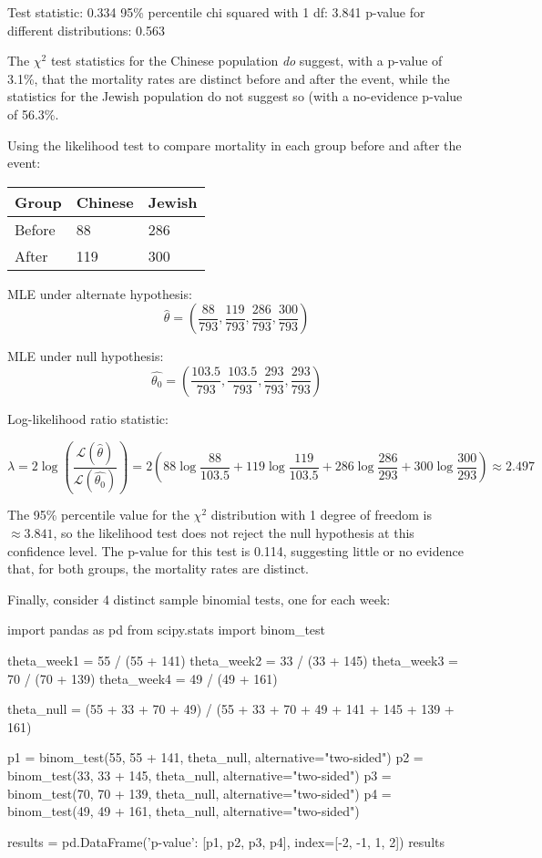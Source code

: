 \begin{console}
Test statistic:                         0.334
95\% percentile chi squared with 1 df:   3.841
p-value for different distributions:    0.563
\end{console}

The \(\chi^{2}\) test statistics for the Chinese population \emph{do}
suggest, with a p-value of 3.1\%, that the mortality rates are distinct
before and after the event, while the statistics for the Jewish
population do not suggest so (with a no-evidence p-value of 56.3\%.

Using the likelihood test to compare mortality in each group before and
after the event:

\begin{table}[H]
\centering
\begin{tabular}{@{}lll@{}}
\toprule
Group & Chinese & Jewish \\
\midrule
Before & 88 & 286 \\
After & 119 & 300 \\
\bottomrule
\end{tabular}
\end{table}

MLE under alternate hypothesis:
\[\hat{\theta} = \left( \frac{88}{793}, \frac{119}{793}, \frac{286}{793}, \frac{300}{793} \right)\]

MLE under null hypothesis:
\[\hat{\theta_{0}} =\left( \frac{103.5}{793}, \frac{103.5}{793}, \frac{293}{793}, \frac{293}{793} \right)\]

Log-likelihood ratio statistic:

\[ \lambda = 2 \log \left( \frac{\mathcal{L}(\hat{\theta})}{\mathcal{L}(\hat{\theta_{0}})} \right)
= 2 \left( 88 \log \frac{88}{103.5} + 119 \log \frac{119}{103.5} + 286 \log \frac{286}{293} + 300 \log \frac{300}{293} \right) \approx 2.497
\]

The 95\% percentile value for the \(\chi^{2}\) distribution with 1 degree
of freedom is \(\approx 3.841\), so the likelihood test does not reject
the null hypothesis at this confidence level. The p-value for this test
is 0.114, suggesting little or no evidence that, for both groups, the
mortality rates are distinct.

Finally, consider 4 distinct sample binomial tests, one for each week:

\begin{python}
import pandas as pd
from scipy.stats import binom_test

theta_week1 = 55 / (55 + 141)
theta_week2 = 33 / (33 + 145)
theta_week3 = 70 / (70 + 139)
theta_week4 = 49 / (49 + 161)

theta_{n}ull = (55 + 33 + 70 + 49) / (55 + 33 + 70 + 49 + 141 + 145 + 139 + 161)

p1 = binom_test(55, 55 + 141, theta_{n}ull, alternative="two-sided")
p2 = binom_test(33, 33 + 145, theta_{n}ull, alternative="two-sided")
p3 = binom_test(70, 70 + 139, theta_{n}ull, alternative="two-sided")
p4 = binom_test(49, 49 + 161, theta_{n}ull, alternative="two-sided")

results = pd.DataFrame({'p-value': [p1, p2, p3, p4]}, index=[-2, -1, 1, 2])
results
\end{python}

